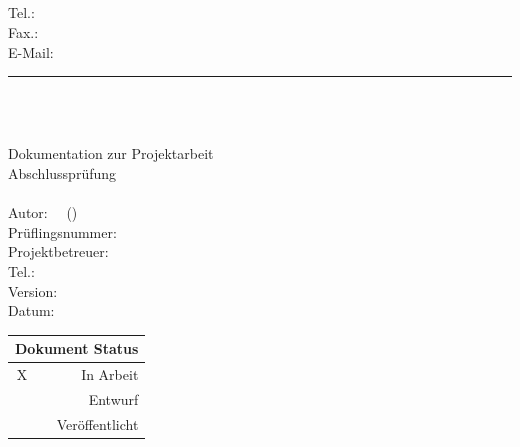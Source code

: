 % 
%
%

\begin{titlepage}
    \noindent
    \logo\\[0.2cm]
    \noindent
    \small \Firma\\
    \small \Firmensitz\\\\
    \small Tel.: \FirmenTel\\
    \small Fax.: \FirmenFax\\
    \small E-Mail: \FirmenEmail\\[2cm]

    \noindent\rule{\textwidth}{1.5pt}\\

    \begin{flushright}
        {\Huge\bfseries\IhrProjektTitel}\\[1cm]
        {\large Dokumentation zur Projektarbeit\\[0.1cm]
                Abschlussprüfung \IhrAbschlusszeitraum\\[0.1cm]
                \IhrAusbildungstitel}\\[3cm]

        {\small Autor: \IhrVorname\ \IhrNachname\ (\IhreID)}\\
        {\small Prüflingsnummer: \IhrePrueflingsnummer}\\
        {\small Projektbetreuer: \IhrProjektbetreuer}\\
        {\small Tel.: \BetreuerTelnr}\\
        {\small Version: \IhreDokuVersion}\\
        {\small Datum: \Datum}\\
        
        \vspace{1cm}
        
        \begin{table}[h!]
            \raggedleft
            \begin{tabular}{|c|r|}
                \multicolumn{2}{r}{\textbf{Dokument Status}} \\ \hline
                X & In Arbeit \\ \hline
                & Entwurf \\ \hline
                & Veröffentlicht \\ \hline
            \end{tabular}
        \end{table}
        

\end{flushright}
\end{titlepage}
